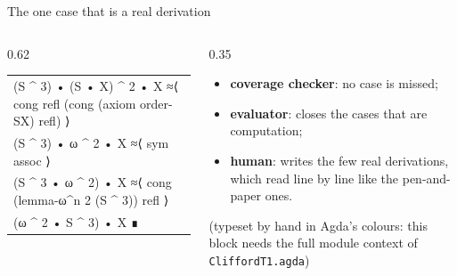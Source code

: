 \begin{frame}{The one case that is a real derivation \InPaper}
\begin{columns}[c]
\begin{column}{0.62\textwidth}
{\begin{tabular}{@{}l@{}}
\quad (\textcolor{AgdaFunction}{S} \textcolor{AgdaFunction}{\textasciicircum} 3) \textcolor{AgdaInductiveConstructor}{•} (\textcolor{AgdaFunction}{S} \textcolor{AgdaInductiveConstructor}{•} \textcolor{AgdaFunction}{X}) \textcolor{AgdaFunction}{\textasciicircum} 2 \textcolor{AgdaInductiveConstructor}{•} \textcolor{AgdaFunction}{X} \textcolor{AgdaFunction}{≈⟨} \textcolor{AgdaInductiveConstructor}{cong} \textcolor{AgdaInductiveConstructor}{refl} (\textcolor{AgdaInductiveConstructor}{cong} (\textcolor{AgdaInductiveConstructor}{axiom} \textcolor{AgdaInductiveConstructor}{order-SX}) \textcolor{AgdaInductiveConstructor}{refl}) \textcolor{AgdaFunction}{⟩}\\
\quad (\textcolor{AgdaFunction}{S} \textcolor{AgdaFunction}{\textasciicircum} 3) \textcolor{AgdaInductiveConstructor}{•} \textcolor{AgdaFunction}{ω} \textcolor{AgdaFunction}{\textasciicircum} 2 \textcolor{AgdaInductiveConstructor}{•} \textcolor{AgdaFunction}{X} \textcolor{AgdaFunction}{≈⟨} \textcolor{AgdaInductiveConstructor}{sym} \textcolor{AgdaInductiveConstructor}{assoc} \textcolor{AgdaFunction}{⟩}\\
\quad (\textcolor{AgdaFunction}{S} \textcolor{AgdaFunction}{\textasciicircum} 3 \textcolor{AgdaInductiveConstructor}{•} \textcolor{AgdaFunction}{ω} \textcolor{AgdaFunction}{\textasciicircum} 2) \textcolor{AgdaInductiveConstructor}{•} \textcolor{AgdaFunction}{X} \textcolor{AgdaFunction}{≈⟨} \textcolor{AgdaInductiveConstructor}{cong} (\textcolor{AgdaFunction}{lemma-ω\textasciicircum{}n} 2 (\textcolor{AgdaFunction}{S} \textcolor{AgdaFunction}{\textasciicircum} 3)) \textcolor{AgdaInductiveConstructor}{refl} \textcolor{AgdaFunction}{⟩}\\
\quad (\textcolor{AgdaFunction}{ω} \textcolor{AgdaFunction}{\textasciicircum} 2 \textcolor{AgdaInductiveConstructor}{•} \textcolor{AgdaFunction}{S} \textcolor{AgdaFunction}{\textasciicircum} 3) \textcolor{AgdaInductiveConstructor}{•} \textcolor{AgdaFunction}{X} \textcolor{AgdaFunction}{∎}
\end{tabular}}
\end{column}
\begin{column}{0.35\textwidth}
\begin{keybox}[title=Division of labour]
\small
\begin{itemize}
  \item \textbf{coverage checker}: no case is missed;
  \item \textbf{evaluator}: closes the cases that are computation;
  \item \textbf{human}: writes the few real derivations, which read
        line by line like the pen-and-paper ones.
\end{itemize}
\end{keybox}
\vspace{4pt}
{\scriptsize (typeset by hand in Agda's colours: this block needs the full
module context of \texttt{CliffordT1.agda})}
\end{column}
\end{columns}
\end{frame}

